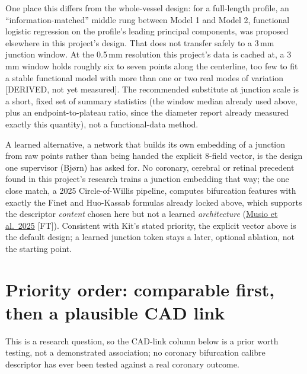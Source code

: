 \documentclass[11pt]{article}
\begin{document}
One place this differs from the whole-vessel design: for a full-length profile, an
``information-matched'' middle rung between Model 1 and Model 2, functional logistic regression on
the profile's leading principal components, was proposed elsewhere in this project's design. That
does not transfer safely to a 3\,mm junction window. At the 0.5\,mm resolution this project's data
is cached at, a 3\,mm window holds roughly six to seven points along the centerline, too few to fit a
stable functional model with more than one or two real modes of variation [DERIVED, not yet
measured]. The recommended substitute at junction scale is a short, fixed set of summary statistics
(the window median already used above, plus an endpoint-to-plateau ratio, since the diameter report
already measured exactly this quantity), not a functional-data method.

A learned alternative, a network that builds its own embedding of a junction from raw points rather
than being handed the explicit 8-field vector, is the design one supervisor (Bj\o rn) has asked for.
No coronary, cerebral or retinal precedent found in this project's research trains a junction
embedding that way; the one close match, a 2025 Circle-of-Willis pipeline, computes bifurcation
features with exactly the Finet and Huo-Kassab formulas already locked above, which supports the
descriptor \emph{content} chosen here but not a learned \emph{architecture}
(\href{https://arxiv.org/html/2510.13720v1}{Musio et al.\ 2025} [FT]). Consistent with Kit's stated
priority, the explicit vector above is the default design; a learned junction token stays a later,
optional ablation, not the starting point.

\section*{Priority order: comparable first, then a plausible CAD link}

This is a research question, so the CAD-link column below is a prior worth testing, not a
demonstrated association; no coronary bifurcation calibre descriptor has ever been tested against a
real coronary outcome.
\end{document}
